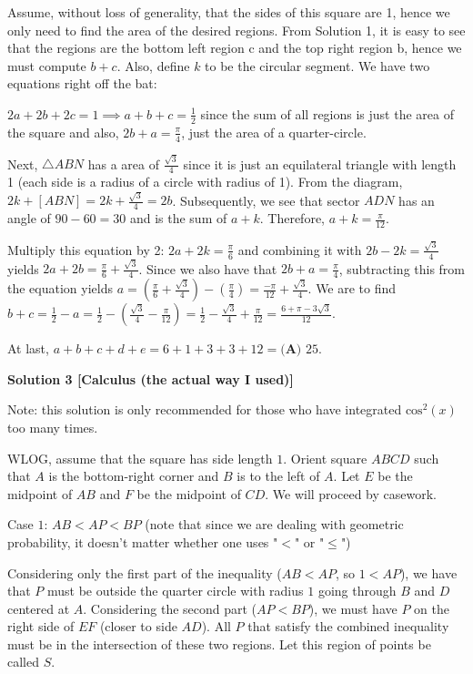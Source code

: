 \begin{enumerate}
 Assume, without loss of generality, that the sides of this square are 1, hence we only need to find the area of the desired regions. From Solution 1, it is easy to see that the regions are the bottom left region c and the top right region b, hence we must compute $b+c$.  Also, define $k$ to be the circular segment. We have two equations right off the bat: 

 $2a+2b+2c=1 \implies a+b+c=\frac{1}{2}$ since the sum of all regions is just the area of the square and also, $2b+a=\frac{\pi}{4}$, just the area of a quarter-circle.

 Next, $\triangle ABN$ has a area of $\frac{\sqrt{3}}{4}$ since it is just an equilateral triangle with length 1 (each side is a radius of a circle with radius of 1). From the diagram, $2k+[ABN]=2k+\frac{\sqrt3}{4}=2b$. Subsequently, we see that sector $ADN$ has an angle of $90-60=30$ and is the sum of $a+k$. Therefore, $a+k=\frac{\pi}{12}$.

 Multiply this equation by 2: $2a+2k=\frac{\pi}{6}$ and combining it with $2b-2k=\frac{\sqrt{3}}{4}$ yields $2a+2b=\frac{\pi}{6}+\frac{\sqrt{3}}{4}$. Since we also have that $2b+a=\frac{\pi}{4}$, subtracting this from the equation yields $a=(\frac{\pi}{6}+\frac{\sqrt{3}}{4}) - (\frac{\pi}{4}) = \frac{-\pi}{12}+\frac{\sqrt{3}}{4}$. We are to find $b+c=\frac{1}{2}-a=\frac{1}{2} - (\frac{\sqrt{3}}{4} - \frac{\pi}{12}) = \frac{1}{2} - \frac{\sqrt{3}}{4} + \frac{\pi}{12} = \frac{6+\pi-3\sqrt{3}}{12}$.

 At last, $a+b+c+d+e=6+1+3+3+12=\boxed{\textbf{(A) } 25}$.

 



\textbf{Solution 3 [Calculus (the actual way I used)]}

Note: this solution is only recommended for those who have integrated $\text{cos}^2(x)$ too many times.

 WLOG, assume that the square has side length $1$. Orient square $ABCD$ such that $A$ is the bottom-right corner and $B$ is to the left of $A$. Let $E$ be the midpoint of $AB$ and $F$ be the midpoint of $CD$. We will proceed by casework.

 Case $1$: $AB<AP<BP$ (note that since we are dealing with geometric probability, it doesn't matter whether one uses "$<$" or "$\leq$")

 Considering only the first part of the inequality ($AB<AP$, so $1<AP$), we have that $P$ must be outside the quarter circle with radius $1$ going through $B$ and $D$ centered at $A$. Considering the second part ($AP<BP$), we must have $P$ on the right side of $EF$ (closer to side $AD$). All $P$ that satisfy the combined inequality must be in the intersection of these two regions. Let this region of points be called $S$. 


\end{enumerate}
